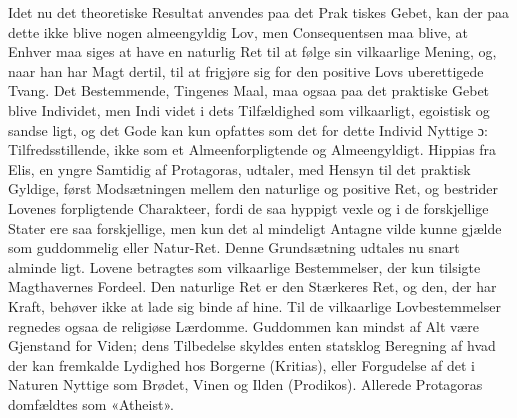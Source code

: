 \documentclass[12pt,a4paper]{book}
\begin{document}
Idet nu det theoretiske Resultat anvendes paa det Prak\-%
tiskes Gebet, kan der paa dette ikke blive nogen almeengyldig
Lov, men Consequentsen maa blive, at Enhver maa siges at
have en naturlig Ret til at følge sin vilkaarlige Mening, og,
naar han har Magt dertil, til at frigjøre sig for den positive
Lovs uberettigede Tvang. Det Bestemmende, Tingenes Maal,
maa ogsaa paa det praktiske Gebet blive Individet, men Indi\-%
videt i dets Tilfældighed som vilkaarligt, egoistisk og sandse\-%
ligt, og det Gode kan kun opfattes som det for dette Individ
Nyttige ɔ: Tilfredsstillende, ikke som et Almeenforpligtende
og Almeengyldigt. Hippias fra Elis, en yngre Samtidig af
Protagoras, udtaler, med Hensyn til det praktisk Gyldige, først
Modsætningen mellem den naturlige og positive Ret, og bestrider
Lovenes forpligtende Charakteer, fordi de saa hyppigt vexle og
i de forskjellige Stater ere saa forskjellige, men kun det al\-%
mindeligt Antagne vilde kunne gjælde som guddommelig eller
Natur-Ret. Denne Grundsætning udtales nu snart alminde\-%
ligt. Lovene betragtes som vilkaarlige Bestemmelser, der kun
tilsigte Magthavernes Fordeel. Den naturlige Ret er den
Stærkeres Ret, og den, der har Kraft, behøver ikke at lade sig
binde af hine. Til de vilkaarlige Lovbestemmelser regnedes
ogsaa de religiøse Lærdomme. Guddommen kan mindst af
Alt være Gjenstand for Viden; dens Tilbedelse skyldes enten
statsklog Beregning af hvad der kan fremkalde Lydighed hos
Borgerne (Kritias), eller Forgudelse af det i Naturen Nyttige
som Brødet, Vinen og Ilden (Prodikos). Allerede Protagoras
domfældtes som «Atheist».
\end{document}
